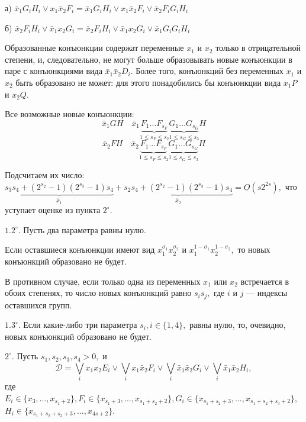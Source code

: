 \documentclass[12pt,a4paper,oneside,fleqn,leqno]{article}
\theoremstyle{definition}
\begin{document}
			а) $\bar{x}_1G_iH_i \vee x_1\bar{x}_2F_i = \bar{x}_1G_iH_i \vee x_1\bar{x}_2F_i \vee \bar{x}_2F_iG_iH_i$\par
			б) $\bar{x}_2F_iH_i \vee \bar{x}_1x_2G_i = \bar{x}_2F_iH_i \vee \bar{x}_1x_2G_i \vee \bar{x}_1G_iG_iH_i$\par
			Образованные конъюнкции содержат переменные $x_1$ и $x_2$ только в отрицательной степени, и, следовательно, не могут больше образовывать новые конъюнкции в паре с конъюнкциями вида $\bar{x}_1\bar{x}_2D_i.$ Более того, конъюнкций без переменных $x_1$ и $x_2$ быть образовано не может: для этого понадобились бы конъюнкции вида $x_1P$ и $x_2Q.$\par
			Все возможные новые конъюнкции:
			$$
				\bar{x}_1GH \quad \bar{x}_1\underbrace{F_1\ldots F_{s_F}}_{1 \leqslant s_F \leqslant s_2}\underbrace{G_1\ldots G_{s_G}}_{1 \leqslant s_G \leqslant s_3}H$$
			$$
				 \bar{x}_2FH \quad\bar{x}_2\underbrace{F_1\ldots F_{s_F}}_{1 \leqslant s_F \leqslant s_2}\underbrace{G_1\ldots G_{s_G}}_{1 \leqslant s_G \leqslant s_3}H
			$$\par
			Подсчитаем их число: $\underbrace{s_3s_4 + (2^{s_2} - 1)(2^{s_3} - 1)s_4}_{\bar{x}_1} + \underbrace{s_2s_4 + (2^{s_2} - 1)(2^{s_3} - 1)s_4}_{\bar{x}_2} = \underline{O}(s2^{2s}),$ что уступает оценке из пункта $2^{\circ}.$\par
			$1.2^{\circ}.$ Пусть два параметра равны нулю.\par
			Если оставшиеся конъюнкции имеют вид $x_1^{\sigma_1}x_2^{\sigma_2}$ и $x_1^{1 - \sigma_1}x_2^{1 - \sigma_2},$ то новых конъюнкций образовано не будет.\par
			В противном случае, если только одна из переменных $x_1$ или $x_2$ встречается в обоих степенях, то число новых конъюнкций равно $s_is_j,$ где $i$ и $j$ --- индексы оставшихся групп.\par
			$1.3^{\circ}.$ Если какие-либо три параметра $s_i, i\in\{1,4\},$ равны нулю, то, очевидно, новых конъюнкций образовано не будет.\par
			$2^{\circ}.$ Пусть $s_1, s_2, s_3, s_4 > 0,$ и
			$$\mathcal{D} =\bigvee_ix_1x_2E_i \vee \bigvee_ix_1\bar{x}_2F_i \vee \bigvee_i\bar{x}_1\bar{x}_2G_i \vee \bigvee_i\bar{x}_1\bar{x}_2H_i,$$
			где $E_i \in \{x_3,\ldots,x_{s_1 + 2} \}, F_i \in \{x_{s_1 + 3}, \ldots, x_{s_1 + s_2 + 2}\}, G_i \in \{x_{s_1 + s_2 + 3}, \ldots, x_{s_1 + s_2 + s_3 + 2}\}$,\\$H_i \in \{x_{s_1 + s_2  + s_3 + 3}, \ldots, x_{4s + 2}\}.$\par
			
\end{document}
